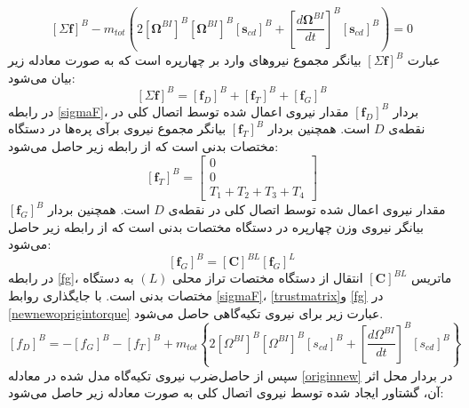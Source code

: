 \begin{equation}\label{newnewoprigintorque}
	\left[\Sigma \boldsymbol f\right]^B - 
	m_{tot}\left(2
	\left[\boldsymbol\Omega^{BI}\right]^B
	\left[\boldsymbol\Omega^{BI}\right]^B
	\left[\boldsymbol s_{cd}\right]^B+
	\left[\dfrac{d\boldsymbol\Omega^{BI}}{dt}\right]^B
	\left[\boldsymbol s_{cd}\right]^B
	\right) = 0
\end{equation}
عبارت 
$\left[\Sigma \boldsymbol f\right]^B$
بیانگر مجموع نیروهای وارد بر چهارپره است که به صورت معادله زیر بیان می‌شود:
\begin{equation}\label{sigmaF}
	\left[\Sigma \boldsymbol f\right]^B = \left[\boldsymbol f_D\right]^B+\left[\boldsymbol f_T\right]^B+
	\left[\boldsymbol f_G\right]^B
\end{equation}
در رابطه 
\ref{sigmaF}، بردار 
$\left[\boldsymbol f_D\right]^B$
مقدار نیروی اعمال‌ شده توسط اتصال کلی در نقطه‌ی
$D$
است. همچنین  بردار 
$\left[\boldsymbol f_T\right]^B$
بیانگر مجموع نیروی برآی پره‌ها در دستگاه مختصات بدنی است که از رابطه زیر حاصل می‌شود:
\begin{equation}\label{trustmatrix}
	\left[\boldsymbol f_T\right]^B = \begin{bmatrix}
		0\\0\\
		T_1+T_2+T_3+T_4
	\end{bmatrix}
\end{equation}
مقدار نیروی اعمال‌ شده توسط اتصال کلی در نقطه‌ی
$D$
است. همچنین  بردار 
$\left[\boldsymbol f_G\right]^B$
بیانگر نیروی وزن چهارپره در دستگاه مختصات بدنی است که از رابطه زیر حاصل می‌شود:
\begin{equation}\label{fg}
	\left[\boldsymbol f_G\right]^B = \left[\boldsymbol C\right]^{BL}
	\left[\boldsymbol f_G\right]^L
\end{equation}
در رابطه
\ref{fg}،
ماتریس
$\left[\boldsymbol C\right]^{BL}$
 انتقال از دستگاه مختصات تراز محلی
$(L)$
 به دستگاه مختصات بدنی است. با جایگذاری روابط
\ref{sigmaF}،
\ref{trustmatrix}و
\ref{fg}
در \ref{newnewoprigintorque}
عبارت زیر برای نیروی تكیه‌گاهی حاصل می‌شود.
\begin{equation}\label{originnew}
	\left[f_D\right]^B = 
	-\left[f_G\right]^B-
	\left[f_T\right]^B+
	m_{tot}\left\{2
	\left[\Omega^{BI}\right]^B
	\left[\Omega^{BI}\right]^B
	\left[s_{cd}\right]^B+
	\left[\dfrac{d\Omega^{BI}}{dt}\right]^B
	\left[s_{cd}\right]^B
	\right\}
\end{equation}
سپس از حاصل‌ضرب نیروی تكیه‌گاه مدل‌ شده در معادله
\ref{originnew}
 در بردار محل اثر آن، گشتاور ایجاد شده
توسط نیروی اتصال کلی به صورت معادله زیر حاصل می‌شود:
